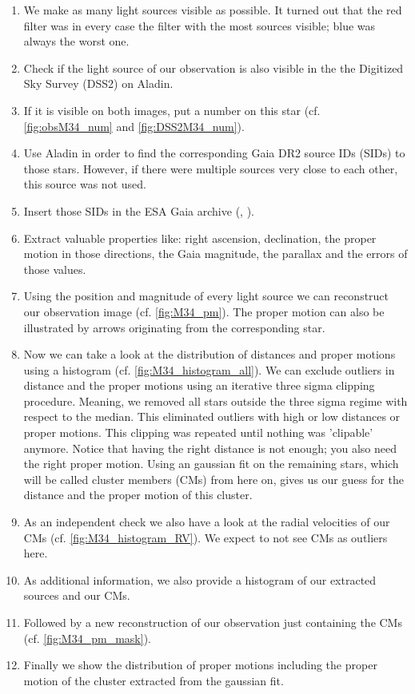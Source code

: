 \documentclass{article}
\begin{document}
\begin{enumerate}

\item We make as many light sources visible as possible. It turned out that the red filter was in every case the filter with the most sources visible; blue was always the worst one.
\item Check if the light source of our observation is also visible in the the Digitized Sky Survey (DSS2) on Aladin\cite{Boch2014}.
\item If it is visible on both images, put a number on this star (cf. \ref{fig:obsM34_num} and \ref{fig:DSS2M34_num}).
\item Use Aladin in order to find the corresponding Gaia DR2 source IDs (SIDs) to those stars. However, if there were multiple sources very close to each other, this source was not used.
\item Insert those SIDs in the ESA Gaia archive (\cite{Gaia2016}, \cite{Gaia2018}).
\item Extract valuable properties like: right ascension, declination, the proper motion in those directions, the Gaia magnitude, the parallax and the errors of those values.
\item Using the position and magnitude of every light source we can reconstruct our observation image (cf. \ref{fig:M34_pm}). The proper motion can also be illustrated by arrows originating from the corresponding star.
\item Now we can take a look at the distribution of distances and proper motions using a histogram (cf. \ref{fig:M34_histogram_all}). We can exclude outliers in distance and the proper motions using an iterative three sigma clipping procedure. Meaning, we removed all stars outside the three sigma regime with respect to the median. This eliminated outliers with high or low distances or proper motions. This clipping was repeated until nothing was 'clipable' anymore. Notice that having the right distance is not enough; you also need the right proper motion. Using an gaussian fit on the remaining stars, which will be called cluster members (CMs) from here on, gives us our guess for the distance and the proper motion of this cluster.
\item As an independent check we also have a look at the radial velocities of our CMs (cf. \ref{fig:M34_histogram_RV}). We expect to not see CMs as outliers here.
\item As additional information, we also provide a histogram of our extracted sources and our CMs.
\item Followed by a new reconstruction of our observation just containing the CMs (cf. \ref{fig:M34_pm_mask}). 
\item Finally we show the distribution of proper motions including the proper motion of the cluster extracted from the gaussian fit.

\end{enumerate}
\end{document}
